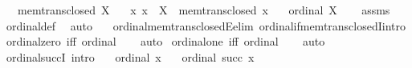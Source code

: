 \begin{isabellebody}
\ \ \ {\isachardoublequoteopen}mem{\isacharunderscore}{\kern0pt}trans{\isacharunderscore}{\kern0pt}closed\ X{\isachardoublequoteclose}\isanewline
\ \ \ {\isachardoublequoteopen}{\isasymAnd}x{\isachardot}{\kern0pt}\ x\ {\isasymin}\ X\ {\isasymLongrightarrow}\ mem{\isacharunderscore}{\kern0pt}trans{\isacharunderscore}{\kern0pt}closed\ x{\isachardoublequoteclose}\isanewline
\ \ \ {\isachardoublequoteopen}ordinal\ X{\isachardoublequoteclose}\isanewline
%
\isadelimproof
\ \ %
\endisadelimproof
%
\isatagproof
{}\isamarkupfalse%
\ assms\ \isamarkupfalse%
\ ordinal{\isacharunderscore}{\kern0pt}def\ \isamarkupfalse%
\ auto%
\endisatagproof
{\isafoldproof}%
%
\isadelimproof
\isanewline
%
\endisadelimproof
\isanewline
{}\isamarkupfalse%
\isanewline
\ \ \ ordinal{\isacharunderscore}{\kern0pt}mem{\isacharunderscore}{\kern0pt}trans{\isacharunderscore}{\kern0pt}closedE{\isacharbrackleft}{\kern0pt}elim{\isacharbang}{\kern0pt}{\isacharbrackright}{\kern0pt}\ ordinal{\isacharunderscore}{\kern0pt}if{\isacharunderscore}{\kern0pt}mem{\isacharunderscore}{\kern0pt}trans{\isacharunderscore}{\kern0pt}closedI{\isacharbrackleft}{\kern0pt}intro{\isacharbang}{\kern0pt}{\isacharbrackright}{\kern0pt}\isanewline
{}\isanewline
\isanewline
{}\isamarkupfalse%
\ ordinal{\isacharunderscore}{\kern0pt}zero\ {\isacharbrackleft}{\kern0pt}iff{\isacharbrackright}{\kern0pt}{\isacharcolon}{\kern0pt}\ {\isachardoublequoteopen}ordinal\ {}{\isachardoublequoteclose}%
\isadelimproof
\ %
\endisadelimproof
%
\isatagproof
{}\isamarkupfalse%
\ auto%
\endisatagproof
{\isafoldproof}%
%
\isadelimproof
%
\endisadelimproof
\isanewline
\isanewline
{}\isamarkupfalse%
\ ordinal{\isacharunderscore}{\kern0pt}one\ {\isacharbrackleft}{\kern0pt}iff{\isacharbrackright}{\kern0pt}{\isacharcolon}{\kern0pt}\ {\isachardoublequoteopen}ordinal\ {}{\isachardoublequoteclose}%
\isadelimproof
\ %
\endisadelimproof
%
\isatagproof
{}\isamarkupfalse%
\ auto%
\endisatagproof
{\isafoldproof}%
%
\isadelimproof
%
\endisadelimproof
\isanewline
\isanewline
{}\isamarkupfalse%
\ ordinal{\isacharunderscore}{\kern0pt}succI\ {\isacharbrackleft}{\kern0pt}intro{\isacharbrackright}{\kern0pt}{\isacharcolon}{\kern0pt}\isanewline
\ \ \ {\isachardoublequoteopen}ordinal\ x{\isachardoublequoteclose}\isanewline
\ \ \ {\isachardoublequoteopen}ordinal\ {\isacharparenleft}{\kern0pt}succ\ x{\isacharparenright}{\kern0pt}{\isachardoublequoteclose}\isanewline

\end{isabellebody}
